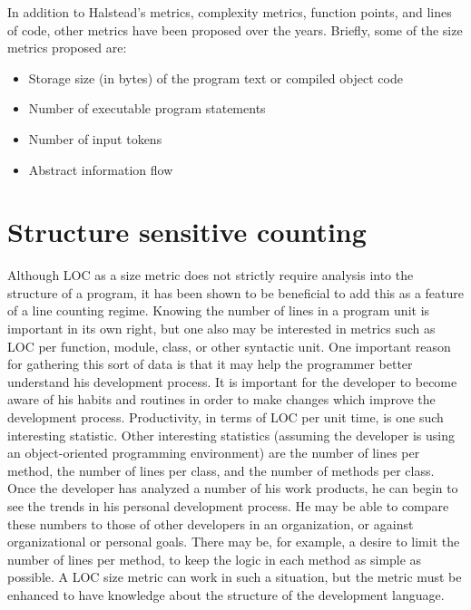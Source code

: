 In addition to Halstead's metrics, complexity metrics, function points, and 
lines of code, other metrics have been proposed over the years.  Briefly,
some of the size metrics proposed are:

\begin{itemize}

\item Storage size (in bytes) of the program text or compiled object
      code

\item Number of executable program statements

\item Number of input tokens \cite{Levitin}

\item Abstract information flow \cite{Tausworthe92}

\end{itemize}

\section{Structure sensitive counting}  

Although LOC as a size metric does not strictly require analysis into the
structure of a program, it has been shown to be beneficial to add this as a
feature of a line counting regime\cite{Humphrey,Laranjeira90,Lorenz}.
Knowing the number of lines in a program unit is important in its own
right, but one also may be interested in metrics such as LOC per function,
module, class, or other syntactic unit.  One important reason for gathering
this sort of data is that it may help the programmer better understand his
development process.  It is important for the developer to become aware of
his habits and routines in order to make changes which improve the
development process.  Productivity, in terms of LOC per unit time, is one
such interesting statistic.  Other interesting statistics (assuming the
developer is using an object-oriented programming environment) are the
number of lines per method, the number of lines per class, and the number
of methods per class.  Once the developer has analyzed a number of his work
products, he can begin to see the trends in his personal development
process.  He may be able to compare these numbers to those of other
developers in an organization, or against organizational or personal goals.
There may be, for example, a desire to limit the number of lines per
method, to keep the logic in each method as simple as possible.  A LOC size
metric can work in such a situation, but the metric must be enhanced to
have knowledge about the structure of the development language.

